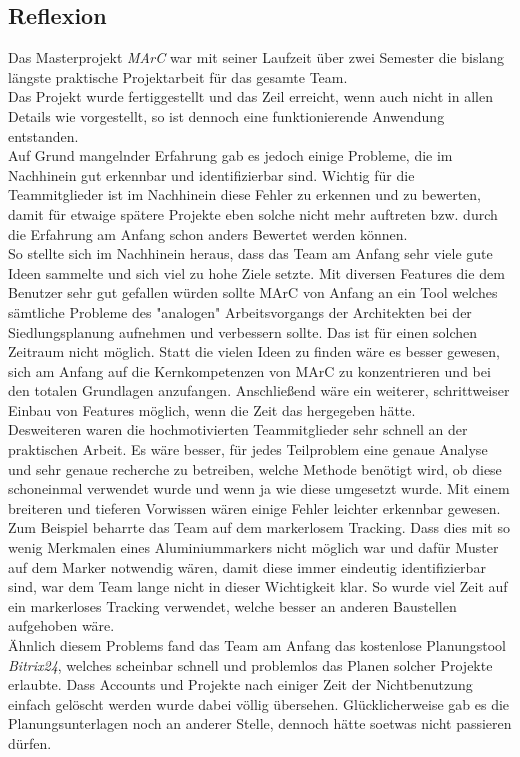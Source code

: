 \subsection{Reflexion}
Das Masterprojekt \textit{MArC} war mit seiner Laufzeit über zwei Semester die bislang längste praktische Projektarbeit für das gesamte Team. \\
Das Projekt wurde fertiggestellt und das Zeil erreicht, wenn auch nicht in allen Details wie vorgestellt, so ist dennoch eine funktionierende Anwendung entstanden.\\
Auf Grund mangelnder Erfahrung gab es jedoch einige Probleme, die im Nachhinein gut erkennbar und identifizierbar sind. Wichtig für die Teammitglieder ist im Nachhinein diese Fehler zu erkennen und zu bewerten, damit für etwaige spätere Projekte eben solche nicht mehr auftreten bzw. durch die Erfahrung am Anfang schon anders Bewertet werden können.\\
So stellte sich im Nachhinein heraus, dass das Team am Anfang sehr viele gute Ideen sammelte und sich viel zu hohe Ziele setzte. Mit diversen Features die dem Benutzer sehr gut gefallen würden sollte MArC von Anfang an ein Tool welches sämtliche Probleme des "analogen" Arbeitsvorgangs der Architekten bei der Siedlungsplanung aufnehmen und verbessern sollte. Das ist für einen solchen Zeitraum nicht möglich. Statt die vielen Ideen zu finden wäre es besser gewesen, sich am Anfang auf die Kernkompetenzen von MArC zu konzentrieren und bei den totalen Grundlagen anzufangen. Anschließend wäre ein weiterer, schrittweiser Einbau von Features möglich, wenn die Zeit das hergegeben hätte.\\
Desweiteren waren die hochmotivierten Teammitglieder sehr schnell an der praktischen Arbeit. Es wäre besser, für jedes Teilproblem eine genaue Analyse und sehr genaue recherche zu betreiben, welche Methode benötigt wird, ob diese schoneinmal verwendet wurde und wenn ja wie diese umgesetzt wurde. Mit einem breiteren und tieferen Vorwissen wären einige Fehler leichter erkennbar gewesen. Zum Beispiel beharrte das Team auf dem markerlosem Tracking. Dass dies mit so wenig Merkmalen eines Aluminiummarkers nicht möglich war und dafür Muster auf dem Marker notwendig wären, damit diese immer eindeutig identifizierbar sind, war dem Team lange nicht in dieser Wichtigkeit klar. So wurde viel Zeit auf ein markerloses Tracking verwendet, welche besser an anderen Baustellen aufgehoben wäre. \\
Ähnlich diesem Problems fand das Team am Anfang das kostenlose Planungstool \textit{Bitrix24}, welches scheinbar schnell und problemlos das Planen solcher Projekte erlaubte. Dass Accounts und Projekte nach einiger Zeit der Nichtbenutzung einfach gelöscht werden wurde dabei völlig übersehen. Glücklicherweise gab es die Planungsunterlagen noch an anderer Stelle, dennoch hätte soetwas nicht passieren dürfen.\\
